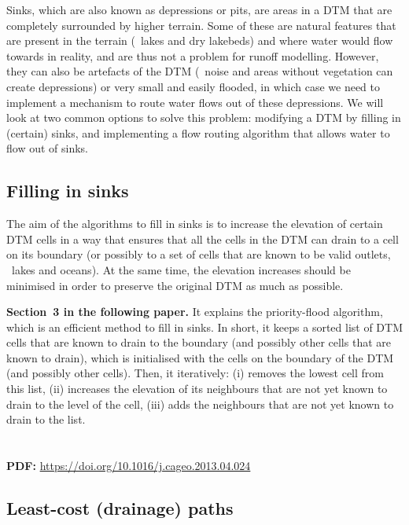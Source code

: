 Sinks, which are also known as depressions or pits, are areas in a DTM that are completely surrounded by higher terrain.
Some of these are natural features that are present in the terrain (\eg\ lakes and dry lakebeds) and where water would flow towards in reality, and are thus not a problem for runoff modelling.
However, they can also be artefacts of the DTM (\eg\ noise and areas without vegetation can create depressions) or very small and easily flooded\@, in which case we need to implement a mechanism to route water flows out of these depressions.
We will look at two common options to solve this problem: modifying a DTM by filling in (certain) sinks, and implementing a flow routing algorithm that allows water to flow out of sinks.

\subsection{Filling in sinks}

The aim of the algorithms to fill in sinks is to increase the elevation of certain DTM cells in a way that ensures that all the cells in the DTM can drain to a cell on its boundary (or possibly to a set of cells that are known to be valid outlets, \eg\ lakes and oceans)\@.
At the same time, the elevation increases should be minimised in order to preserve the original DTM as much as possible.

\begin{link-box}
\textbf{Section~3 in the following paper.} It explains the priority-flood algorithm, which is an efficient method to fill in sinks.
In short, it keeps a sorted list of DTM cells that are known to drain to the boundary (and possibly other cells that are known to drain), which is initialised with the cells on the boundary of the DTM (and possibly other cells)\@.
Then, it iteratively: (i) removes the lowest cell from this list, (ii) increases the elevation of its neighbours that are not yet known to drain to the level of the cell, (iii) adds the neighbours that are not yet known to drain to the list.
\\
\\
\\
\textbf{PDF:} \url{https://doi.org/10.1016/j.cageo.2013.04.024}
\end{link-box}

\subsection{Least-cost (drainage) paths}

